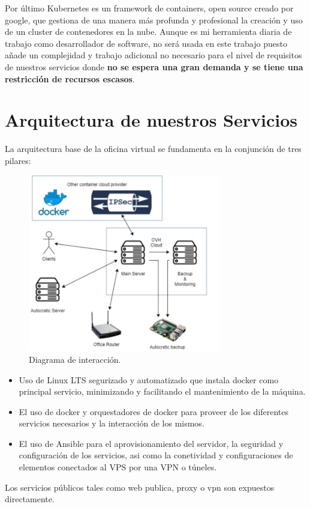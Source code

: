 Por último Kubernetes\cite{c_kubernetes} es un framework de containers, open source creado por google, que gestiona de una manera más profunda y profesional la creación y uso de un cluster de contenedores en la nube. Aunque es mi herramienta diaria de trabajo como desarrollador de software, no será usada en este trabajo puesto añade un complejidad y trabajo adicional no necesario para el nivel de requisitos de nuestros servicios donde \textbf{no se espera una gran demanda y se tiene una restricción de recursos escasos}.

\section{Arquitectura de nuestros Servicios}
La arquitectura base de la oficina virtual se fundamenta en la conjunción de tres pilares:
\begin{figure}[!htb]
\begin{center}
\includegraphics[width=0.75\textwidth]{./figuras/arquitectura.jpg}
\caption{Diagrama de interacción.}
\label{F:arquitectura}
\end{center}
\end{figure}
\begin{itemize}
    \item Uso de Linux LTS segurizado y automatizado que instala docker como principal servicio, minimizando y facilitando el mantenimiento de la máquina.
    \item El uso de docker y orquestadores de docker para proveer de los diferentes servicios necesarios y la interacción de los mismos.
    \item El uso de Ansible para el aprovisionamiento del servidor, la seguridad y configuración de los servicios, asi como la conetividad y configuraciones de elementos conectados al VPS por una VPN o túneles.
\end{itemize}
Los servicios públicos tales como web publica, proxy o vpn son expuestos directamente.

